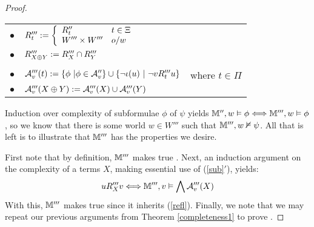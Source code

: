 \begin{proof}
  \begin{center}
    \begin{tabular}{lll}
      $\bullet$ & $R'''_t \assign \left\{ \begin{array}{ll}
        R''_t & t \in \Xi\\
        W''' \times W''' & o / w
      \end{array} \right.$ & \\
      $\bullet$ & $R'''_{X \oplus Y} \assign R'''_X \cap R'''_Y$ & \\
      &  & \\
      $\bullet$ & $\mathcal{A}'''_v (t) \assign \{\phi \  | \phi \in
      \mathcal{A}''_v \} \cup \{\neg \iota (u) \  | \ 
      \neg v R'''_t u\}$ & where $t \in \Pi$\\
      $\bullet$ & $\mathcal{A}'''_v (X \oplus Y) \assign \mathcal{A}'''_v (X)
      \cup \mathcal{A}'''_v (Y)$ & 
    \end{tabular}
  \end{center}
  
  
  
  
  
  Induction over complexity of subformulae $\phi$ of $\psi$ yields
  $\mathbbm{M}'', w \vDash \phi \Longleftrightarrow \mathbbm{M}''', w \vDash
  \phi$, so we know that there is some world $w \in W'''$ such that
  $\mathbbm{M}''', w \nvDash \psi$.  All that is left is to illustrate that
  $\mathbbm{M}'''$ has the properties we desire.
  
  
  
  First note that by definition, $\mathbbm{M}'''$ makes true
  .  Next, an induction argument on the complexity of a
  terms $X$, making essential use of (\ref{sub}$'$), yields:
  \[ u R_X''' v \Longleftrightarrow \mathbbm{M}''', v \vDash \bigwedge
     \mathcal{A}'''_v (X) \]
  With this, $\mathbbm{M}'''$ makes true  since it inherits
  (\ref{refl}).  Finally, we note that we may repeat our previous arguments
  from Theorem \ref{completeness1} to prove \tmtextbf{JCSQ}.
\end{proof}


